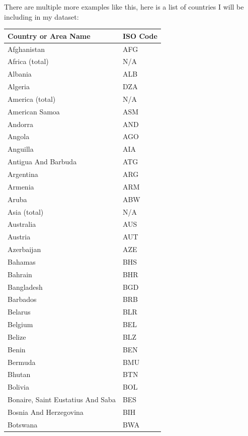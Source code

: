 \documentclass{report}
\begin{document}
There are multiple more examples like this, here is a list of countries I will be including in my dataset:
\newpage
\begin{center}
    \begin{minipage}{0.46\textwidth}
        \begin{tabular}{|p{10.5em}|p{6em}|}
            \hline
            Country or Area Name & ISO Code\\
            \hline
            Afghanistan & AFG\\
            Africa (total) & N/A\\
            Albania & ALB\\
            Algeria & DZA\\
            America (total) & N/A\\
            American Samoa & ASM\\
            Andorra & AND\\
            Angola & AGO\\
            Anguilla & AIA\\
            Antigua And Barbuda & ATG\\
            Argentina & ARG\\
            Armenia & ARM\\
            Aruba & ABW\\
            Asia (total) & N/A\\
            Australia & AUS\\
            Austria & AUT\\
            Azerbaijan & AZE\\
            Bahamas & BHS\\
            Bahrain & BHR\\
            Bangladesh & BGD\\
            Barbados & BRB\\
            Belarus & BLR\\
            Belgium & BEL\\
            Belize & BLZ\\
            Benin & BEN\\
            Bermuda & BMU\\
            Bhutan & BTN\\
            Bolivia & BOL\\
            Bonaire, Saint Eustatius And Saba & BES\\
            Bosnia And Herzegovina & BIH\\
            Botswana & BWA\\

\end{tabular}
\end{minipage}
\end{center}
\end{document}
